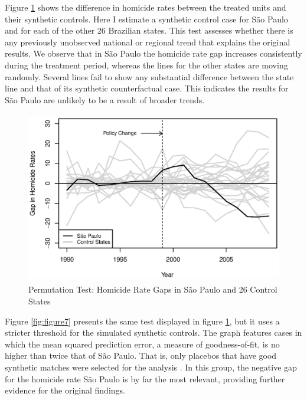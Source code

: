 Figure \ref{fig:figure6} shows the difference in homicide rates between the treated units and their synthetic controls. Here I estimate a synthetic control case for São Paulo and for each of the other 26 Brazilian states. This test assesses whether there is any previously unobserved national or regional trend that explains the original results. We observe that in São Paulo the homicide rate gap increases consistently during the treatment period, whereas the lines for the other states are moving randomly. Several lines fail to show any substantial difference between the state line and that of its synthetic counterfactual case. This indicates the results for São Paulo are unlikely to be a result of broader trends.

\begin{figure}[H]
    \centering
    \includegraphics[height=7.5cm]{images/permutation-gaps2.eps}
    \caption{Permutation Test: Homicide Rate Gaps in São Paulo and 26 Control States}
    \label{fig:figure6}
\end{figure}

Figure \ref{fig:figure7} presents the same test displayed in figure \ref{fig:figure6}, but it uses a stricter threshold for the simulated synthetic controls. The graph features cases in which the mean squared prediction error, a measure of goodness-of-fit, is no higher than twice that of São Paulo. That is, only placebos that have good synthetic matches were selected for the analysis \citep[503]{abadie2010}.  In this group, the negative gap for the homicide rate São Paulo is by far the most relevant, providing further evidence for the original findings.

